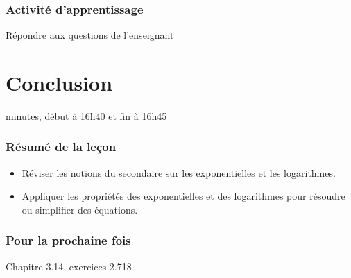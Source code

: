 \documentclass[12pt]{article}
\begin{document}
\subsubsection*{\faCalculator{} Activité d'apprentissage}
Répondre aux questions de l'enseignant

\clearpage
\section{Conclusion}
 minutes, début à 16h40 et fin à 16h45
\subsubsection*{\faList{} Résumé de la leçon}
\begin{itemize}
    \item Réviser les notions du secondaire sur les exponentielles et les logarithmes.
    \item Appliquer les propriétés des exponentielles et des logarithmes pour résoudre ou simplifier des équations.
\end{itemize}
\subsubsection*{\faCalendar*[regular]{} Pour la prochaine fois}
Chapitre 3.14, exercices 2.718
\end{document}
